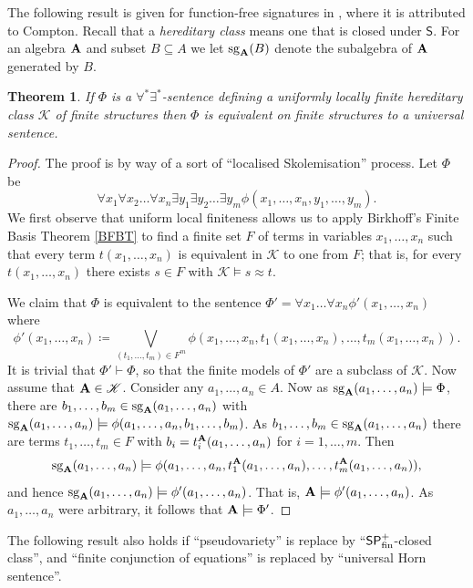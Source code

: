 \documentclass[reqno]{amsart}
\theoremstyle{plain}
\newtheorem{thm}{Theorem}[section]
\theoremstyle{definition}
\newcommand{\sg}[2]{\mathrm{sg}_{#1}(#2)}
\begin{document}
The following result is given for function-free signatures in \cite[Theorem 3]{gur2}, where it is attributed to Compton.  Recall that a \emph{hereditary class} means one that is closed under $\mathsf{S}$.  For an algebra ${\bf A}$ and subset $B\subseteq A$ we let $\sg{\bf A}{B}$ denote the subalgebra of ${\bf A}$ generated by $B$.
\begin{thm}\label{thm:forallexists}
If $\Phi$ is a $\forall^*\exists^*$-sentence defining a uniformly locally finite hereditary class $\mathscr{K}$ of finite structures 
then $\Phi$ is equivalent on finite structures to a universal sentence.
\end{thm}
\begin{proof}
The proof is by way of a sort of ``localised Skolemisation'' process.  Let $\Phi$ be 
\[
\forall x_1\forall x_2\dots\forall x_n\exists y_1\exists y_2\dots \exists y_m \phi(x_1,\dots,x_n,y_1,\dots,y_m).
\]
We first observe that uniform local finiteness allows us to apply Birkhoff's Finite Basis Theorem \ref{BFBT} to find a finite set $F$ of terms in variables $x_1,\dots,x_n$ such that every term $t(x_1,\dots,x_n)$ is equivalent in $\mathscr{K}$ to one from $F$; that is, for every $t(x_1,\dots,x_n)$ there exists $s\in F$ with $\mathscr{K}\models s\approx t$.  

We claim that $\Phi$ is equivalent to the  sentence $\Phi'=\forall x_1\dots\forall x_n\phi'(x_1,\dots,x_n)$ where
\[
\phi'(x_1,\dots,x_n)\coloneqq  \bigvee_{(t_1,\dots,t_m)\in F^m}\phi(x_1,\dots,x_n,t_1(x_1,\dots,x_n),\dots,t_m(x_1,\dots,x_n)).
\]
It is trivial that $\Phi'\vdash \Phi$, so that the finite models of $\Phi'$ are a subclass of $\mathscr{K}$.  Now assume that ${\bf A}\in\mathscr{K}$.  Consider any $a_1,\dots,a_n\in A$.  Now as $\sg{{\bf A}}{a_1,\dots,a_n}\models \Phi$, there are $b_1,\dots,b_m\in \sg{{\bf A}}{a_1,\dots,a_n}$ with $\sg{{\bf A}}{a_1,\dots,a_n}\models \phi(a_1,\dots,a_n,b_1,\dots,b_m)$.  As $b_1,\dots,b_m\in \sg{{\bf A}}{a_1,\dots,a_n}$ there are terms $t_1,\dots,t_m\in F$ with $b_i=t_i^{\bf A}(a_1,\dots,a_n)$ for $i=1,\dots,m$.  Then 
\[
\sg{{\bf A}}{a_1,\dots,a_n}\models \phi(a_1,\dots,a_n,t_1^{\bf A}(a_1,\dots,a_n),\dots,t_m^{\bf A}(a_1,\dots,a_n)),
\]
and hence $\sg{{\bf A}}{a_1,\dots,a_n}\models\phi'(a_1,\dots,a_n)$.  That is, ${\bf A}\models \phi'(a_1,\dots,a_n)$.  As $a_1,\dots,a_n$ were arbitrary, it follows that ${\bf A}\models \Phi'$.
\end{proof}
The following result also holds if ``pseudovariety'' is replace by ``$\mathsf{SP}_{\rm fin}^+$-closed class'', and ``finite conjunction of equations'' is replaced by ``universal Horn sentence''.
\end{document}
